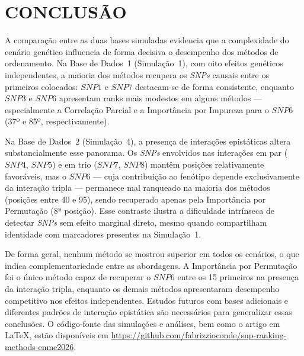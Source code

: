 \documentclass[12pt,fleqn]{article}
\begin{document}
\section{CONCLUSÃO}

A comparação entre as duas bases simuladas evidencia que a complexidade do cenário genético influencia de forma decisiva o desempenho dos métodos de ordenamento. Na Base de Dados~1 (Simulação~1), com oito efeitos genéticos independentes, a maioria dos métodos recupera os \emph{SNPs} causais entre os primeiros colocados: $SNP1$ e $SNP7$ destacam-se de forma consistente, enquanto $SNP3$ e $SNP6$ apresentam ranks mais modestos em alguns métodos --- especialmente a Correlação Parcial e a Importância por Impureza para o $SNP6$ (37º e 85º, respectivamente).

Na Base de Dados~2 (Simulação~4), a presença de interações epistáticas altera substancialmente esse panorama. Os \emph{SNPs} envolvidos nas interações em par ($SNP4$, $SNP5$) e em trio ($SNP7$, $SNP8$) mantêm posições relativamente favoráveis, mas o $SNP6$ --- cuja contribuição ao fenótipo depende exclusivamente da interação tripla --- permanece mal ranqueado na maioria dos métodos (posições entre 40 e 95), sendo recuperado apenas pela Importância por Permutação (8ª posição). Esse contraste ilustra a dificuldade intrínseca de detectar \emph{SNPs} sem efeito marginal direto, mesmo quando compartilham identidade com marcadores presentes na Simulação~1.

De forma geral, nenhum método se mostrou superior em todos os cenários, o que indica complementariedade entre as abordagens. A Importância por Permutação foi o único método capaz de recuperar o $SNP6$ entre os 15 primeiros na presença da interação tripla, enquanto os demais métodos apresentaram desempenho competitivo nos efeitos independentes. Estudos futuros com bases adicionais e diferentes padrões de interação epistática são necessários para generalizar essas conclusões. O código-fonte das simulações e análises, bem como o artigo em \LaTeX, estão disponíveis em \url{https://github.com/fabrizzioconde/snp-ranking-methods-enmc2026}.


\fontsize{11}{0}\selectfont

\end{document}
